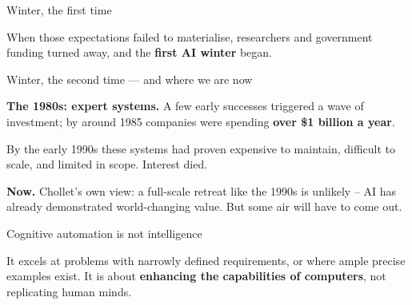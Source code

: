\documentclass[aspectratio=169,11pt,t]{beamer}
\begin{document}
\begin{frame}[shrink=25]{Winter, the first time}
\begin{iquote}
\end{iquote}
\begin{iquote}
\end{iquote}
{\fontsize{9.4}{12.6}\selectfont\color{fg2}When those expectations failed to materialise, researchers and government funding turned away, and the \textbf{first AI winter} began.\par}\vskip 4pt
\end{frame}

\begin{frame}[shrink=25]{Winter, the second time --- and where we are now}
\begin{minipage}[t]{0.485\textwidth}
{\fontsize{9.4}{12.6}\selectfont\color{fg2}\textbf{The 1980s: expert systems.} A few early successes triggered a wave of investment; by around 1985 companies were spending \textbf{over \$1 billion a year}.\par}\vskip 4pt
{\fontsize{9.4}{12.6}\selectfont\color{fg2}By the early 1990s these systems had proven expensive to maintain, difficult to scale, and limited in scope. Interest died.\par}\vskip 4pt

\end{minipage}%
\hfill
\begin{minipage}[t]{0.485\textwidth}
\begin{iband}[signal]
\textbf{Now.} Chollet's own view: a full-scale retreat like the 1990s is unlikely -- AI has already demonstrated world-changing value.  But some air will have to come out.
\end{iband}

\end{minipage}%
\end{frame}

\begin{frame}[shrink=25]{Cognitive automation is not intelligence}
\begin{iquote}
\end{iquote}
{\fontsize{9.4}{12.6}\selectfont\color{fg2}It excels at problems with narrowly defined requirements, or where ample precise examples exist. It is about \textbf{enhancing the capabilities of computers}, not replicating human minds.\par}\vskip 4pt
\end{frame}
\end{document}
